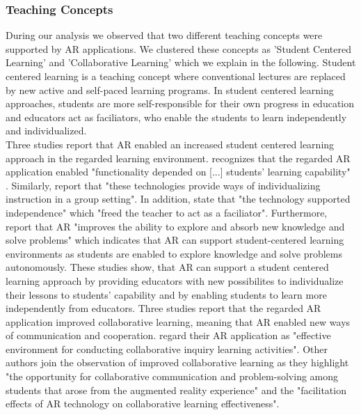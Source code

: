 \subsubsection{Teaching Concepts}
During our analysis we observed that two different teaching concepts were supported by AR applications. We clustered these concepts as 'Student Centered Learning' and 'Collaborative Learning' which we explain in the following.
Student centered learning is a teaching concept where conventional lectures are replaced by new active and self-paced learning programs. In student centered learning approaches, students are more self-responsible for their own progress in education and educators act as faciliators, who enable the students to learn independently and individualized.\\
Three studies report that AR enabled an increased student centered learning approach in the regarded learning environment. \cite{VateULan.2012} recognizes that the regarded AR application enabled "functionality depended on [...] students’ learning capability" \autocite [894]{VateULan.2012}. Similarly, \cite{Kamarainen.2013} report that "these technologies provide ways of individualizing instruction in a group setting".\autocite[\label{fn:Kamarainen_2013_554}p. 554]{Kamarainen.2013} In addition, \cite{Kamarainen.2013} state that "the technology supported independence" which "freed the teacher to act as a faciliator". Furthermore, \cite{Liu.2009b} report that AR "improves the ability to explore and absorb new knowledge and solve problems" \autocite[173]{Liu.2009b} which indicates that AR can support student-centered learning environments as students are enabled to explore knowledge and solve problems autonomously. These studies show, that AR can support a student centered learning approach by providing educators with new possibilites to individualize their lessons to students' capability and by enabling students to learn more independently from educators.
Three studies report that the regarded AR application improved collaborative learning, meaning that AR enabled new ways of communication and cooperation. \cite{Wang.2012} regard their AR application as "effective environment for conducting collaborative inquiry learning activities". \autocite[57]{Wang.2012} Other authors join the observation of improved collaborative learning as they highlight "the opportunity for collaborative communication and problem-solving among students that arose from the augmented reality experience" \autocite[552]{Kamarainen.2013} and the "facilitation effects of AR technology on collaborative learning effectiveness".\autocite[322]{Li.2011}
% 
